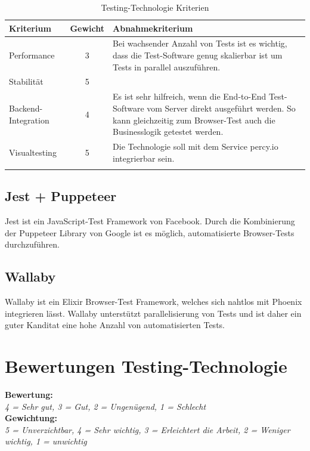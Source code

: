 \begin{longtable}[]{@{}p{2cm}cp{10cm}@{}}
  \toprule
  \textbf{Kriterium}  & \textbf{Gewicht} & \textbf{Abnahmekriterium}\tabularnewline
  \midrule
  \endhead
  Performance         & 3                & Bei wachsender Anzahl von Tests ist es wichtig, dass die Test-Software genug skalierbar ist um Tests in parallel auszuführen.\tabularnewline
  \midrule
  Stabilität          & 5                & \tabularnewline
  \midrule
  Backend-Integration & 4                & Es ist sehr hilfreich, wenn die End-to-End Test-Software vom Server direkt ausgeführt werden. So kann gleichzeitig zum Browser-Test auch die Businesslogik getestet werden.\tabularnewline
  \midrule
  Visualtesting       & 5                & Die Technologie soll mit dem Service percy.io integrierbar sein.\tabularnewline
  \bottomrule
  \caption{Testing-Technologie Kriterien}
\end{longtable}

\subsection{Jest + Puppeteer}

Jest ist ein JavaScript-Test Framework von Facebook. Durch die Kombinierung der
Puppeteer Library von Google ist es möglich, automatisierte Browser-Tests
durchzuführen.

\subsection{Wallaby}

Wallaby ist ein Elixir Browser-Test Framework, welches sich nahtlos mit Phoenix
integrieren lässt. Wallaby unterstützt parallelisierung von Tests und ist daher
ein guter Kanditat eine hohe Anzahl von automatisierten Tests.

\clearpage
\section{Bewertungen Testing-Technologie}\label{bewertungen-testing-technologie}

\textbf{Bewertung:}\\
\textit{4 = Sehr gut, 3 = Gut, 2 = Ungenügend, 1 = Schlecht}\\
\textbf{Gewichtung:}\\
\textit{5 = Unverzichtbar, 4 = Sehr wichtig, 3 = Erleichtert die Arbeit, 2 = Weniger wichtig, 1 = unwichtig}\\

